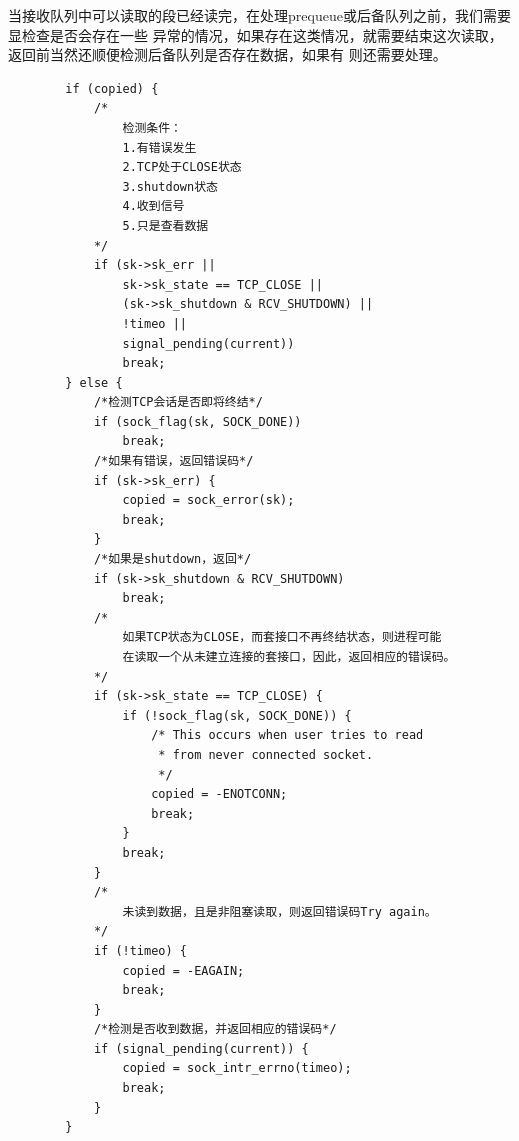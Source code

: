     当接收队列中可以读取的段已经读完，在处理prequeue或后备队列之前，我们需要显检查是否会存在一些
    异常的情况，如果存在这类情况，就需要结束这次读取，返回前当然还顺便检测后备队列是否存在数据，如果有
    则还需要处理。  
\begin{verbatim}
        if (copied) {
            /*
                检测条件：
                1.有错误发生
                2.TCP处于CLOSE状态
                3.shutdown状态
                4.收到信号
                5.只是查看数据
            */          
            if (sk->sk_err ||
                sk->sk_state == TCP_CLOSE ||
                (sk->sk_shutdown & RCV_SHUTDOWN) ||
                !timeo ||
                signal_pending(current))
                break;
        } else {
            /*检测TCP会话是否即将终结*/
            if (sock_flag(sk, SOCK_DONE))
                break;
            /*如果有错误，返回错误码*/
            if (sk->sk_err) {
                copied = sock_error(sk);
                break;
            }
            /*如果是shutdown，返回*/
            if (sk->sk_shutdown & RCV_SHUTDOWN)
                break;
            /*
                如果TCP状态为CLOSE，而套接口不再终结状态，则进程可能
                在读取一个从未建立连接的套接口，因此，返回相应的错误码。
            */
            if (sk->sk_state == TCP_CLOSE) {
                if (!sock_flag(sk, SOCK_DONE)) {
                    /* This occurs when user tries to read
                     * from never connected socket.
                     */
                    copied = -ENOTCONN;
                    break;
                }
                break;
            }
            /*
                未读到数据，且是非阻塞读取，则返回错误码Try again。
            */
            if (!timeo) {
                copied = -EAGAIN;
                break;
            }
            /*检测是否收到数据，并返回相应的错误码*/
            if (signal_pending(current)) {
                copied = sock_intr_errno(timeo);
                break;
            }
        }
\end{verbatim}

